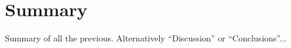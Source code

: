 \documentclass[english,12pt,a4paper,pdftex,elec,utf8]{aaltothesis}
\begin{document}
\clearpage

\section{Summary} \label{summarysection}


Summary of all the previous. Alternatively ``Discussion'' or ``Conclusions''...


\clearpage

\thesisbibliography

%



\printbibliography




\clearpage

\thesisappendix


\end{document}
